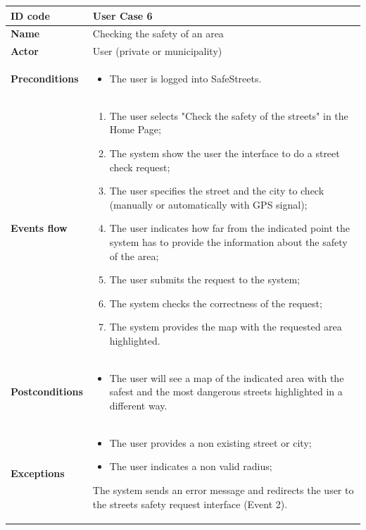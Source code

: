 \documentclass[titlepage]{article}
\begin{document}
\newpage

\begin{longtable}{| p{3 cm} | p{10 cm} |} 
\hline

\textbf{ID code} & User Case 6 \\ \hline
\textbf{Name} & Checking the safety of an area \\ \hline
\textbf{Actor} & User (private or municipality) \\ \hline
\textbf{Preconditions} & 
\begin{itemize}
\item The user is logged into SafeStreets.
\end{itemize}\\ \hline

\textbf{Events flow} &
\begin{enumerate}
\item The user selects "Check the safety of the streets" in the Home Page;
\item The system show the user the interface to do a street check request;
\item The user specifies the street and the city to check (manually or automatically with GPS signal);
\item The user indicates how far from the indicated point the system has to provide the information about the safety of the area;
\item The user submits the request to the system;
\item The system checks the correctness of the request;
\item The system provides the map with the requested area highlighted. 
\end{enumerate} \\ \hline
\textbf{Postconditions} & 
\begin{itemize}
\item The user will see a map of the indicated area with the safest and the most dangerous streets highlighted in a different way.
\end{itemize} \\ \hline
\textbf{Exceptions} &
\begin{itemize}
\item The user provides a non existing street or city;
\item The user indicates a non valid radius;
\end{itemize}
The system sends an error message and redirects the user to the streets safety request interface (Event 2). \\ \hline



\end{longtable}
\end{document}
